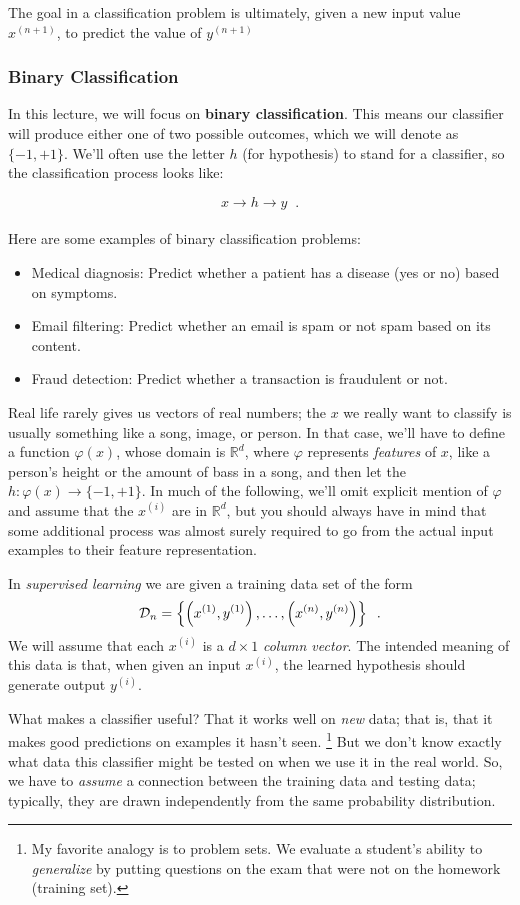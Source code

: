 \documentclass[11pt]{article}
\newcommand{\anchorednote}[2]{ #1 \note{#2} }	%
\newcommand{\note}[1]{\todo[color=blue!10,
  linecolor=blue!90,size=\small]{\linespread{0.9}\selectfont{#1}\par}}
\renewcommand{\note}[1]{\footnote{#1}}
\newcommand\ex[2]{#1^{(#2)}}
\newcommand\data{{\cal D}}
\newcommand{\R}{\mathbb{R}}
\begin{document}
The goal in a classification problem is ultimately, given a new input value $\ex{x}{n+1}$, to predict the value of $\ex{y}{n+1}$

\subsubsection*{Binary Classification}
In this lecture, we will focus on \textbf{binary classification}. This means our classifier will produce either one of two possible outcomes, which we will denote as \( \{-1, +1\} \). We'll often use the letter $h$ (for hypothesis) to stand for a classifier, so the classification process looks like:

$$ x \rightarrow \boxed{h} \rightarrow y \;\;.$$
\\
Here are some examples of binary classification problems:
\begin{itemize}
    \item Medical diagnosis: Predict whether a patient has a disease (yes or no) based on symptoms.
    \item Email filtering: Predict whether an email is spam or not spam based on its content.
    \item Fraud detection: Predict whether a transaction is fraudulent or not.
\end{itemize}

Real life rarely gives us vectors of real numbers;  the $x$ we really
want to classify is usually something like  a song, image, or person.
In that case, we'll have to define a function $\varphi(x)$, whose
domain is $\R^d$, where $\varphi$ represents 
{\em features} of $x$, like a person's height or the amount of bass in
a song, and then let the $h: \varphi(x) \rightarrow \{-1, +1\}$. 
In much of the following, we'll omit explicit mention of $\varphi$ and
assume that the $\ex{x}{i}$ are in $\R^d$, but you should always have
in mind that some additional process was almost surely required to go
from the actual input examples to their feature representation.

In {\em{supervised learning}} we are given a training data set of the
form 
\[ \data_n = \left\{\left(\ex{x}{1}, \ex{y}{1}\right), \dots, \left(\ex{x}{n},
    \ex{y}{n}\right)\right\} \;\;.\]
We will assume that each $\ex{x}{i}$ is a $d \times 1$ {\em column
  vector}. The intended meaning of this data is that, when given an input
$\ex{x}{i}$, the learned hypothesis should generate output
$\ex{y}{i}$.

What makes a classifier useful? That it works well on {\em new} data;
that is, that it makes good predictions on \anchorednote{examples it hasn't
seen.}{My favorite analogy is to problem sets.  We evaluate a
  student's ability to {\em generalize} by putting questions on
  the exam that were not on the homework (training set).}
But we don't know exactly what data this classifier might be tested on
when we use it in the real world. So, we have to {\em{assume}} a
connection between the training data and testing data; typically, they
are drawn independently from the same probability distribution. 
\end{document}
